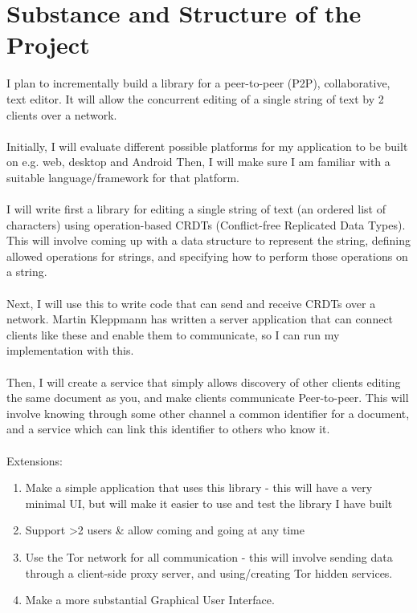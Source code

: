 \documentclass[12pt,a4paper]{article}
\begin{document}
\section*{Substance and Structure of the Project}
I plan to incrementally build a library for a peer-to-peer (P2P), collaborative, text editor. It will allow the concurrent editing of a single string of text by 2 clients over a network.\\\\
Initially, I will evaluate different possible platforms for my application to be built on e.g. web, desktop and Android
Then, I will make sure I am familiar with a suitable language/framework for that platform.\\\\
I will write first a library for editing a single string of text (an ordered list of characters) using operation-based CRDTs (Conflict-free Replicated Data Types). This will involve coming up with a data structure to represent the string, defining allowed operations for strings, and specifying how to perform those operations on a string.\\\\
Next, I will use this to write code that can send and receive CRDTs over a network. Martin Kleppmann has written a server application that can connect clients like these and enable them to communicate, so I can run my implementation with this.\\\\
Then, I will create a service that simply allows discovery of other clients editing the same document as you, and make clients communicate Peer-to-peer. This will involve knowing through some other channel a common identifier for a document, and a service which can link this identifier to others who know it. \\\\
Extensions:
\begin{enumerate}[label=\alph*)]
\item Make a simple application that uses this library - this will have a very minimal UI, but will make it easier to use and test the library I have built
\item Support \textgreater 2 users \& allow coming and going at any time
\item Use the Tor network for all communication - this will involve sending data through a client-side proxy server, and using/creating Tor hidden services.
\item  Make a more substantial Graphical User Interface.\\
\end{enumerate}
\end{document}
